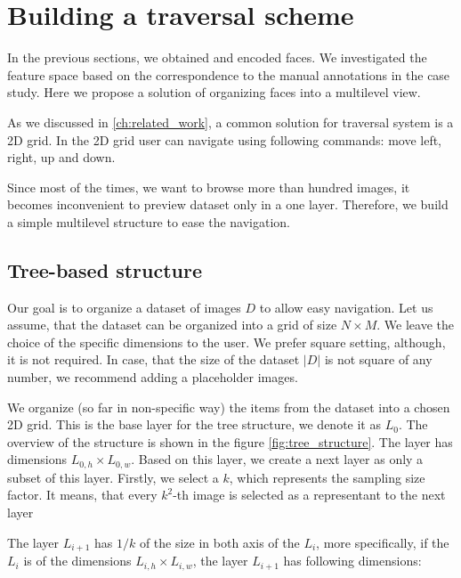 \section{Building a traversal scheme}

In the previous sections, we obtained and encoded faces. We investigated the feature space based on the correspondence to the manual annotations in the case study. Here we propose a solution of organizing faces into a multilevel view. 

As we discussed in \autoref{ch:related_work}, a common solution for traversal system is a 2D grid.  In the 2D grid user can navigate using following commands: move left, right, up and down.



Since most of the times, we want to browse more than hundred images, it becomes inconvenient to preview dataset only in a one layer. Therefore, we build a simple multilevel structure to ease the navigation.

\subsection{Tree-based structure}

Our goal is to organize a dataset of images $D$ to allow easy navigation. Let us assume, that the dataset can be organized into a grid of size $N\times M$. We leave the choice of the specific dimensions to the user. We prefer square setting, although, it is not required. In case, that the size of the dataset $|D|$ is not square of any number, we recommend adding a placeholder images.

We organize (so far in non-specific way) the items from the dataset into a chosen 2D grid. This is the base layer for the tree structure, we denote it as $L_0$. The overview of the structure is shown in the figure \ref{fig:tree_structure}. The layer has dimensions $L_{0, h}\times L_{0, w}$. Based on this layer, we create a next layer as only a subset of this layer. Firstly, we select a $k$, which represents the sampling size factor. It means, that every $k^2$-th image is selected as a representant to the next layer

The layer $L_{i+1}$ has $1/k$ of the size in both axis of the $L_i$, more specifically, if the $L_i$ is of the dimensions $L_{i,h} \times L_{i,w}$, the layer $L_{i+1}$ has following dimensions:

